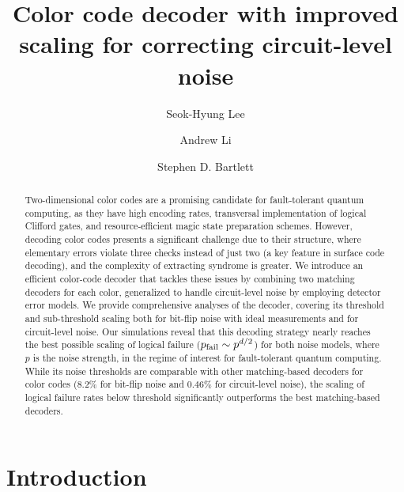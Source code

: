 \documentclass[a4paper,twocolumn,11pt,accepted=2025-01-21]{quantumarticle}
\theoremstyle{definition}
\theoremstyle{definition}
\theoremstyle{definition}
\begin{document}
\title{Color code decoder with improved scaling for correcting circuit-level noise}

\author{Seok-Hyung Lee}
\author{Andrew Li}
\author{Stephen D. Bartlett}

\begin{abstract}

Two-dimensional color codes are a promising candidate for fault-tolerant quantum computing, as they have high encoding rates, transversal implementation of logical Clifford gates, and resource-efficient magic state preparation schemes.
However, decoding color codes presents a significant challenge due to their structure, where elementary errors violate three checks instead of just two (a key feature in surface code decoding), and the complexity of extracting syndrome is greater.
We introduce an efficient color-code decoder that tackles these issues by combining two matching decoders for each color, generalized to handle circuit-level noise by employing detector error models.
We provide comprehensive analyses of the decoder, covering its threshold and sub-threshold scaling both for bit-flip noise with ideal measurements and for circuit-level noise.
Our simulations reveal that this decoding strategy nearly reaches the best possible scaling of logical failure ($p_{\mathrm{fail}} \sim p^{d/2}$) for both noise models, where $p$ is the noise strength, in the regime of interest for fault-tolerant quantum computing.
While its noise thresholds are comparable with other matching-based decoders for color codes ($8.2\%$ for bit-flip noise and $0.46\%$ for circuit-level noise), the scaling of logical failure rates below threshold significantly outperforms the best matching-based decoders.

\end{abstract}

\maketitle

\section{Introduction}
\end{document}
